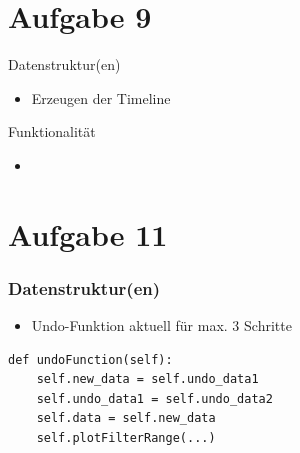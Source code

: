 \documentclass{beamer}
\begin{document}
    \section{Aufgabe 9}
    \begin{frame}{Datenstruktur(en)}
    	\begin{itemize}
    		\setlength\itemsep{1em}
    		\item Erzeugen der Timeline
    	\end{itemize}
    \end{frame}

    \begin{frame}{Funktionalität}
    	\begin{itemize}
    		\setlength\itemsep{1em}
    		\item
    	\end{itemize}
    \end{frame}

    \section{Aufgabe 11}
    \begin{frame}[containsverbatim]
    	\frametitle{Datenstruktur(en)}
    	\begin{itemize}
    		\setlength\itemsep{1em}
    		\item Undo-Funktion aktuell für max. 3 Schritte
    	\end{itemize}
    	\begin{lstlisting}
def undoFunction(self):
	self.new_data = self.undo_data1
	self.undo_data1 = self.undo_data2
	self.data = self.new_data
	self.plotFilterRange(...)
    	\end{lstlisting}
    \end{frame}
\end{document}
